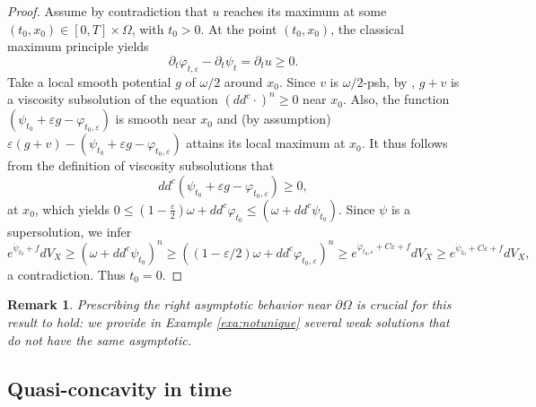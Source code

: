 \documentclass[11pt]{amsart}
\numberwithin{equation}{section}
\newtheorem{remark}[theorem]{Remark}
\newcommand{\f}{\varphi}
\begin{document}
\begin{proof}
  Assume by contradiction that $u$ reaches its maximum at some $(t_0,x_0)\in [0,T]\times \Omega$, with  $t_0>0$. 
 At the point  $(t_0,x_0)$, the classical maximum principle yields
\[
\partial_t \varphi_{t,\varepsilon}  -\partial_t \psi_{t}=  \partial_t u \geq 0. 
\]
Take a local smooth potential $g$ of $\omega/2$ around $x_0$. Since $v$ is $\omega/2$-psh, by \cite[Proposition 1.3]{EGZ11}, $g+v$ is a viscosity subsolution of the equation $(dd^c \cdot )^n \geq 0$ near $x_0$. 
Also, the function $(\psi_{t_0} +\varepsilon g-\varphi_{t_0,\varepsilon})$ is smooth near $x_0$ and (by assumption) $\varepsilon (g+v)-(\psi_{t_0} +\varepsilon g-\varphi_{t_0,\varepsilon})$ attains its local maximum at $x_0$. It thus follows from the definition of viscosity subsolutions that 
$$
dd^c(\psi_{t_0} +\varepsilon g-\varphi_{t_0,\varepsilon})  \geq 0, 
$$
at $x_0$, which yields
$
0\leq \left(1-\frac{\varepsilon}{2}\right)\omega+dd^c \varphi_{t_0} \leq (\omega +dd^c \psi_{t_0}).
$
Since   $\psi$ is a   supersolution, we infer 
\[
e^{{\dot \psi}_{t_0}+f} dV_X \geq   (\omega +dd^c \psi_{t_0})^n \geq ((1-\varepsilon/2)\omega+dd^c \varphi_{t_0,\varepsilon})^n 
\geq e^{\dot{\varphi}_{t_0,\varepsilon}+C\varepsilon+f}dV_X \geq e^{{\dot \psi}_{t_0}+C\varepsilon+f} dV_X,
\]
a contradiction. Thus $t_0=0$.
\end{proof}



 
\begin{remark}
Prescribing the right asymptotic behavior near $\partial \Omega$ is crucial for this result to hold: we provide 
in Example \ref{exa:notunique}  several weak solutions  that do not have the same asymptotic. 
\end{remark}







\subsection{Quasi-concavity in time} \label{sec:concave}

\end{document}
